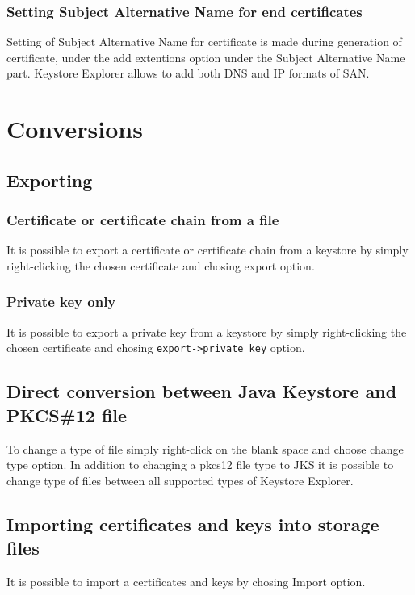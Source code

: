 \documentclass[10pt, a4paper]{report}
\begin{document}
    \subsubsection{Setting Subject Alternative Name for end certificates}
Setting of Subject Alternative Name for certificate is made during generation of certificate, under the add extentions option under the Subject Alternative Name part. Keystore Explorer allows to add both DNS and IP formats of SAN.

\section{Conversions}

  \subsection{Exporting}
  
    \subsubsection{Certificate or certificate chain from a file}
It is possible to export a certificate or certificate chain from a keystore by simply right-clicking the chosen certificate and chosing export option.

    \subsubsection{Private key only}
It is possible to export a private key from a keystore by simply right-clicking the chosen certificate and chosing \verb+export->private key+ option.

  \subsection{Direct conversion between Java Keystore and PKCS\#12 file}
To change a type of file simply right-click on the blank space and choose change type option. In addition to changing a pkcs12 file type to JKS it is possible to change type of files between all supported types of Keystore Explorer.
  
  \subsection{Importing certificates and keys into storage files}
It is possible to import a certificates and keys by chosing Import option.
\end{document}
